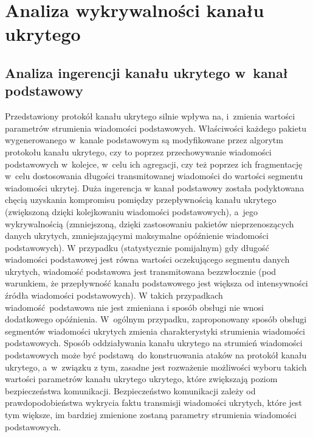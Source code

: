 \documentclass[a4paper, twoside, openright, 12pt]{report}
\begin{document}
\chapter{Analiza wykrywalności kanału ukrytego}
    \section{Analiza ingerencji kanału ukrytego w~kanał podstawowy}
        Przedstawiony protokół kanału ukrytego silnie wpływa na, i~zmienia
        wartości parametrów strumienia wiadomości podstawowych. Właściwości każdego pakietu wygenerowanego
        w~kanale podstawowym są modyfikowane przez algorytm protokołu kanału ukrytego,
        czy to poprzez przechowywanie wiadomości podstawowych w~kolejce, w~celu
        ich agregacji, czy też
        poprzez ich fragmentację w~celu dostosowania długości transmitowanej wiadomości
        do wartości segmentu wiadomości ukrytej. Duża ingerencja w kanał podstawowy
        została podyktowana chęcią uzyskania kompromisu pomiędzy przepływnością
        kanału ukrytego (zwiększoną dzięki kolejkowaniu wiadomości podstawowych),
        a~jego wykrywalnością (zmniejszoną, dzięki zastosowaniu pakietów nieprzenoszących danych ukrytych,
        zmniejszającymi maksymalne opóźnienie wiadomości podstawowych).
        W przypadku (statystycznie pomijalnym) gdy długość wiadomości podstawowej
        jest równa wartości oczekującego segmentu danych ukrytych, wiadomość podstawowa
        jest transmitowana bezzwłocznie (pod warunkiem, że przepływność kanału podstawowego
        jest większa od intensywności źródła wiadomości podstawowych). W takich przypadkach
        wiadomość podstawowa nie jest zmieniana i sposób obsługi nie wnosi dodatkowego
        opóźnienia. W~ogólnym przypadku, zaproponowany sposób obsługi segmentów wiadomości
        ukrytych zmienia charakterystyki strumienia wiadomości podstawowych.
        Sposób oddziaływania kanału ukrytego na strumień wiadomości podstawowych
        może być podstawą do konstruowania ataków na protokół kanału ukrytego,
        a~w~związku z tym, zasadne jest rozważenie możliwości wyboru takich wartości
        parametrów kanału ukrytego ukrytego, które zwiększają poziom bezpieczeństwa
        komunikacji. Bezpieczeństwo komunikacji zależy od prawdopodobieństwa
        wykrycia faktu transmisji wiadomości ukrytych, które jest tym większe,
        im bardziej zmienione zostaną parametry strumienia wiadomości podstawowych.
\end{document}
